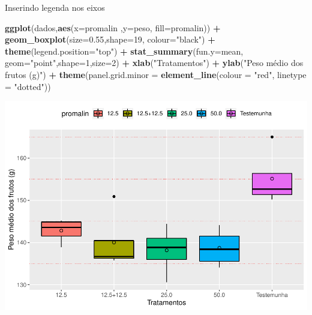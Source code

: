 \documentclass[]{book}
\newenvironment{Shaded}{\begin{snugshade}}{\end{snugshade}}
\newcommand{\DataTypeTok}[1]{\textcolor[rgb]{0.13,0.29,0.53}{#1}}
\newcommand{\DecValTok}[1]{\textcolor[rgb]{0.00,0.00,0.81}{#1}}
\newcommand{\FloatTok}[1]{\textcolor[rgb]{0.00,0.00,0.81}{#1}}
\newcommand{\KeywordTok}[1]{\textcolor[rgb]{0.13,0.29,0.53}{\textbf{#1}}}
\newcommand{\NormalTok}[1]{#1}
\newcommand{\OperatorTok}[1]{\textcolor[rgb]{0.81,0.36,0.00}{\textbf{#1}}}
\newcommand{\StringTok}[1]{\textcolor[rgb]{0.31,0.60,0.02}{#1}}
\begin{document}
Inserindo legenda nos eixos

\begin{Shaded}
\begin{Highlighting}[]
\KeywordTok{ggplot}\NormalTok{(dados,}\KeywordTok{aes}\NormalTok{(}\DataTypeTok{x=}\NormalTok{promalin ,}\DataTypeTok{y=}\NormalTok{peso, }\DataTypeTok{fill=}\NormalTok{promalin)) }\OperatorTok{+}\StringTok{ }
\StringTok{      }\KeywordTok{geom_boxplot}\NormalTok{(}\DataTypeTok{size=}\FloatTok{0.55}\NormalTok{,}\DataTypeTok{shape=}\DecValTok{19}\NormalTok{, }\DataTypeTok{colour=}\StringTok{"black"}\NormalTok{) }\OperatorTok{+}\StringTok{ }
\StringTok{      }\KeywordTok{theme}\NormalTok{(}\DataTypeTok{legend.position=}\StringTok{"top"}\NormalTok{) }\OperatorTok{+}\StringTok{ }
\StringTok{      }\KeywordTok{stat_summary}\NormalTok{(}\DataTypeTok{fun.y=}\NormalTok{mean, }\DataTypeTok{geom=}\StringTok{"point"}\NormalTok{,}\DataTypeTok{shape=}\DecValTok{1}\NormalTok{,}\DataTypeTok{size=}\DecValTok{2}\NormalTok{) }\OperatorTok{+}\StringTok{ }
\StringTok{      }\KeywordTok{xlab}\NormalTok{(}\StringTok{"Tratamentos"}\NormalTok{) }\OperatorTok{+}\StringTok{  }
\StringTok{      }\KeywordTok{ylab}\NormalTok{(}\StringTok{"Peso médio dos frutos (g)"}\NormalTok{)  }\OperatorTok{+}
\StringTok{      }\KeywordTok{theme}\NormalTok{(}\DataTypeTok{panel.grid.minor =} \KeywordTok{element_line}\NormalTok{(}\DataTypeTok{colour =} \StringTok{"red"}\NormalTok{, }\DataTypeTok{linetype =} \StringTok{"dotted"}\NormalTok{)) }
\end{Highlighting}
\end{Shaded}

\includegraphics{TudodoR_files/figure-latex/unnamed-chunk-236-1.pdf}
\end{document}
